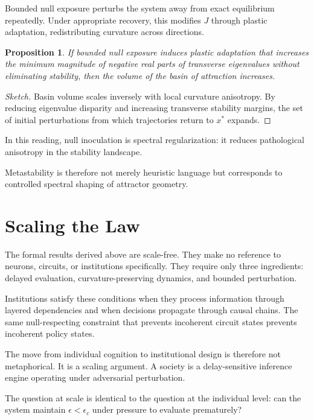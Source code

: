 \documentclass[11pt]{article}
\newtheorem{proposition}{Proposition}
\theoremstyle{remark}
\begin{document}
Bounded null exposure perturbs the system away from exact equilibrium repeatedly. Under appropriate recovery, this modifies $J$ through plastic adaptation, redistributing curvature across directions.

\begin{proposition}
If bounded null exposure induces plastic adaptation that increases the minimum magnitude of negative real parts of transverse eigenvalues without eliminating stability, then the volume of the basin of attraction increases.
\end{proposition}

\begin{proof}[Sketch]
Basin volume scales inversely with local curvature anisotropy. By reducing eigenvalue disparity and increasing transverse stability margins, the set of initial perturbations from which trajectories return to $x^*$ expands.
\end{proof}

In this reading, null inoculation is spectral regularization: it reduces pathological anisotropy in the stability landscape.

Metastability is therefore not merely heuristic language but corresponds to controlled spectral shaping of attractor geometry.


\section{Scaling the Law}
\label{sec:scaling}

The formal results derived above are scale-free. They make no reference to neurons, circuits, or institutions specifically. They require only three ingredients: delayed evaluation, curvature-preserving dynamics, and bounded perturbation.

Institutions satisfy these conditions when they process information through layered dependencies and when decisions propagate through causal chains. The same null-respecting constraint that prevents incoherent circuit states prevents incoherent policy states.

The move from individual cognition to institutional design is therefore not metaphorical. It is a scaling argument. A society is a delay-sensitive inference engine operating under adversarial perturbation.

The question at scale is identical to the question at the individual level: can the system maintain $\epsilon < \epsilon_c$ under pressure to evaluate prematurely?
\end{document}
